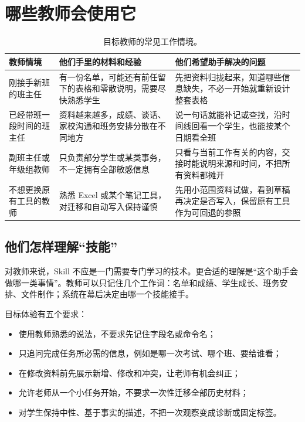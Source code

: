 \documentclass[11pt,a4paper,fontset=none]{ctexart}
\begin{document}
\section{哪些教师会使用它}

\begin{table}[H]
  \centering
  \small
  \caption{目标教师的常见工作情境。}
  \begin{tabular}{p{3.2cm} p{5.1cm} p{6.2cm}}
    \toprule
    教师情境 & 他们手里的材料和经验 & 他们希望助手解决的问题 \\
    \midrule
    刚接手新班的班主任 & 有一份名单，可能还有前任留下的表格和零散说明，需要尽快熟悉学生 & 先把资料归拢起来，知道哪些信息缺失，不必一开始就重新设计整套表格 \\
    已经带班一段时间的班主任 & 资料越来越多，成绩、谈话、家校沟通和班务安排分散在不同地方 & 说一句话就能补记或查找，沿时间线回看一个学生，也能按某个日期看全班 \\
    副班主任或年级组教师 & 只负责部分学生或某类事务，不一定拥有全部敏感信息 & 只看与当前工作有关的内容，交接时能说明来源和时间，不把所有资料都摊开 \\
    不想更换原有工具的教师 & 熟悉 Excel 或某个笔记工具，对迁移和自动写入保持谨慎 & 先用小范围资料试做，看到草稿再决定是否写入，保留原有工具作为可回退的参照 \\
    \bottomrule
  \end{tabular}
\end{table}

\subsection{他们怎样理解“技能”}

对教师来说，Skill 不应是一门需要专门学习的技术。更合适的理解是“这个助手会做哪一类事情”。教师可以只记住几个工作词：名单和成绩、学生成长、班务安排、文件制作；系统在幕后决定由哪一个技能接手。

目标体验有五个要求：

\begin{itemize}
  \item 使用教师熟悉的说法，不要求先记住字段名或命令名；
  \item 只追问完成任务所必需的信息，例如是哪一次考试、哪个班、要给谁看；
  \item 在修改资料前先展示新增、修改和冲突，让老师有机会纠正；
  \item 允许老师从一个小任务开始，不要求一次性迁移全部历史材料；
  \item 对学生保持中性、基于事实的描述，不把一次观察变成诊断或固定标签。
\end{itemize}
\end{document}
